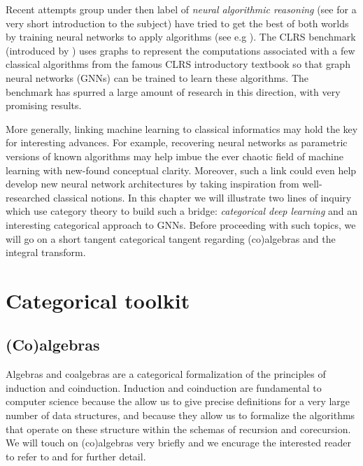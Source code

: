 \documentclass[11pt,a4paper,openright,twoside]{report}
\theoremstyle{plain}
\theoremstyle{definition}
\begin{document}
Recent attempts group under then label of \textit{neural algorithmic reasoning} (see \cite{velivckovic2021neural} for a very short introduction to the subject) have tried to get the best of both worlds by training neural networks to apply algorithms (see e.g \cite{ibarz2022generalist}). The CLRS benchmark (introduced by \cite{velivckovic2022clrs}) uses graphs to represent the computations associated with a few classical algorithms from the famous CLRS introductory textbook so that graph neural networks (GNNs) can be trained to learn these algorithms. The benchmark has spurred a large amount of research in this direction, with very promising results.


More generally, linking machine learning to classical informatics may hold the key for interesting advances. For example, recovering neural networks as parametric versions of known algorithms may help imbue the ever chaotic field of machine learning with new-found conceptual clarity. Moreover, such a link could even help develop new neural network architectures by taking inspiration from well-researched classical notions. In this chapter we will illustrate two lines of inquiry which use category theory to build such a bridge: \textit{categorical deep learning} and an interesting categorical approach to GNNs. Before proceeding with such topics, we will go on a short tangent categorical tangent regarding (co)algebras and the integral transform.




\section{Categorical toolkit}

\subsection{(Co)algebras}
\label{subsec: algebras}

Algebras and coalgebras are a categorical formalization of the principles of induction and coinduction. Induction and coinduction are fundamental to computer science because the allow us to give precise definitions for a very large number of data structures, and because they allow us to formalize the algorithms that operate on these structure within the schemas of recursion and corecursion. We will touch on (co)algebras very briefly and we encurage the interested reader to refer to \cite{jacobs1997tutorial} and \cite{wisbauer2008algebras} for further detail.
\end{document}
